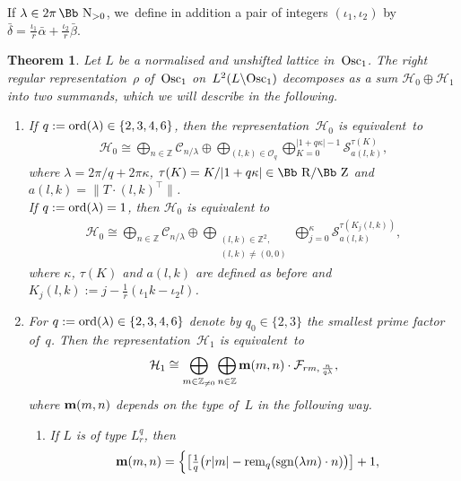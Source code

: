\documentclass[pdftex]{sigma}
\newcommand\RR{{\mbox{\Bb R}}}
\newcommand\NN{{\mbox{\Bb N}}}
\newcommand\ZZ{{\mbox{\Bb Z}}}
\newcommand\Z{{\mathbb Z}}
\newcommand\bm{\textbf{{\rm \textbf{m}}}}
\newcommand\cC{{\mathcal C}}
\newcommand\cH{{\mathcal H}}
\newcommand\cF{{\mathcal F}}
\newcommand\cO{{\mathcal O}}
\newcommand{\Osc}{{\rm Osc}}
\newcommand{\sgn}{\mathop{{\rm sgn}}}
\newcommand{\rem}{\mathop{{\rm rem}}}
\newcommand{\ord}{{\rm ord}}
\numberwithin{equation}{section}
\newtheorem{Theorem}{Theorem}[section]
\begin{document}
If $\lambda\in 2\pi\,\NN_{>0}$, we~define in addition a pair of integers $(\iota_1,\iota_2)$ by $\bar\delta=\frac{\iota_1}r\bar\alpha+\frac{\iota_2}r\bar\beta$.

\begin{Theorem}\label{theo}
Let $L$ be a normalised and unshifted lattice in~$\Osc_1$. The right regular representation~$\rho$ of~$\Osc_1$ on~$L^2(L\backslash\Osc_1)$ decomposes as a sum $\cH_0\oplus\cH_1$ into two summands, which we will describe in the following.
\begin{enumerate}\itemsep=0pt
\item[$1.$] If $q:=\ord(\lambda)\in\{2,3,4,6\}$, then the representation~$\cH_0$ is equivalent~to
\begin{gather}\label{EH0q>1}
\cH_0\cong\bigoplus_{n\in \Z} \cC_{n/\lambda} \oplus \bigoplus
_{(l,k)\in\cO_q}\bigoplus_{K=0}^{|1+q\kappa|-1} {\mathcal S}_{a(l,k)}^{\tau(K)},
\end{gather}
where $\lambda=2\pi/q+2\pi\kappa$, $\tau(K)=K/|1+q\kappa|\in\RR/\ZZ$
and $a(l,k)= \big\|T\cdot (l,k)^\top\big\|$.
\\
If $q:=\ord(\lambda)=1$, then $\cH_0$ is equivalent to
\begin{gather}\label{EH0q=1}
\cH_0\cong\bigoplus_{n\in \Z} \cC_{n/\lambda} \oplus \bigoplus _{\substack{(l,k)\in\Z^2,\\(l,k)\not=(0,0)}} \bigoplus_{j=0}^{\kappa} {\mathcal S}_{a(l,k)}^{\tau(K_j(l,k))},
\end{gather}
where $\kappa$, $\tau(K)$ and $a(l,k)$ are defined as before and $K_j(l,k):=j-\frac1{r}(\iota_1 k-\iota_2l)$.
\item[$2.$]
For $q:=\ord(\lambda)\in\{2,3,4,6\}$ denote by $q_0\in\{2,3\}$ the smallest prime factor of~$q$. Then the representation~$\cH_1$ is equivalent~to
\begin{gather*}
\cH_1\cong \bigoplus_{m\in \Z_{\not=0}} \bigoplus_{n\in\Z} \bm(m,n)\cdot \cF_{rm,\,\frac n{q\lambda}},
\end{gather*}
where $\bm(m,n)$ depends on the type of~$L$ in the following way.
\begin{enumerate}\itemsep=0pt
\item[$(a)$] If $L$ is of type $L_r^q$, then
\begin{gather*}
\bm(m,n) =\begin{cases}
\big[\frac1q \big({r|m|-\rem_q(\sgn(\lambda m)\cdot n)}\big)\big]+1,

\end{cases}
\end{gather*}
\end{enumerate}
\end{enumerate}
\end{Theorem}
\end{document}
